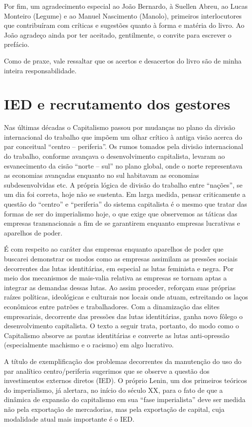 Por fim, um agradecimento especial ao João Bernardo, à Suellen Abreu, ao
Lucas Monteiro (Legume) e ao Manuel Nascimento (Manolo), primeiros
interlocutores que contribuíram com críticas e sugestões quanto à forma
e matéria do livro. Ao João agradeço ainda por ter aceitado,
gentilmente, o convite para escrever o prefácio.

Como de praxe, vale ressaltar que os acertos e desacertos do livro são
de minha inteira responsabilidade.

\chapter{IED e recrutamento dos gestores}

Nas últimas décadas o Capitalismo passou por mudanças no plano da
divisão internacional do trabalho que impõem um olhar crítico à antiga
visão acerca do par conceitual ``centro -- periferia''. Os rumos tomados
pela divisão internacional do trabalho, conforme avançava o
desenvolvimento capitalista, levaram ao esvanecimento da cisão ``norte
-- sul'' no plano global, onde o norte representava as economias
avançadas enquanto no sul habitavam as economias subdesenvolvidas etc. A
própria lógica de divisão do trabalho entre ``nações'', se um dia foi
correta, hoje não se sustenta. Em larga medida, pensar criticamente a
questão do ``centro'' e ``periferia'' do sistema capitalista é o mesmo
que tratar das formas de ser do imperialismo hoje, o que exige que
observemos as táticas das empresas transnacionais a fim de se garantirem
enquanto empresas lucrativas e aparelhos de poder.

É com respeito ao caráter das empresas enquanto aparelhos de poder que
buscarei demonstrar os modos como as empresas assimilam as pressões
sociais decorrentes das lutas identitárias, em especial as lutas
feminista e negra. Por meio dos mecanismos de mais-valia relativa as
empresas se tornam aptas a integrar as demandas dessas lutas. Ao assim
proceder, reforçam suas próprias raízes políticas, ideológicas e
culturais nos locais onde atuam, estreitando os laços econômicos entre
patrões e trabalhadores. Com a dinamização das elites empresariais,
decorrente das pressões das lutas identitárias, ganha novo fôlego o
desenvolvimento capitalista. O texto a seguir trata, portanto, do modo
como o Capitalismo absorve as pautas identitárias e converte as lutas
anti-opressão (especialmente machismo e o racismo) em algo lucrativo.

A título de exemplificação dos problemas decorrentes da manutenção do
uso do par analítico centro/periferia sugerimos que se observe a questão
dos investimentos externos diretos (IED). O próprio Lenin, um dos
primeiros teóricos do imperialismo, já alertara, no início do século XX,
para o fato de que a dinâmica de expansão do capitalismo em sua ``fase
imperialista'' deve ser medida não pela exportação de mercadorias, mas
pela exportação de capital, cuja modalidade atual mais importante é o
IED.

